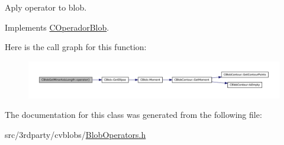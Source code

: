 Aply operator to blob. 



Implements \hyperlink{class_c_operador_blob_a303c4189cc94cafbcbee116bf014e623}{COperadorBlob}.



Here is the call graph for this function:
\nopagebreak
\begin{figure}[H]
\begin{center}
\leavevmode
\includegraphics[width=400pt]{class_c_blob_get_minor_axis_length_a2269bfa1651667f020e27d9f1e8f8d98_cgraph}
\end{center}
\end{figure}




The documentation for this class was generated from the following file:\begin{DoxyCompactItemize}
\item 
src/3rdparty/cvblobs/\hyperlink{_blob_operators_8h}{BlobOperators.h}\end{DoxyCompactItemize}
